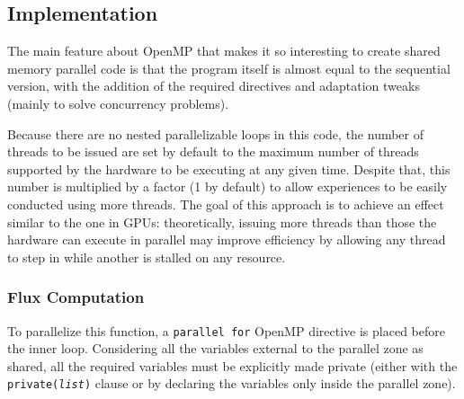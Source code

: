 \documentclass[9pt,twocolumn]{scrartcl}
\newcommand{\paragraphh}[1]{\paragraph{#1\hfill}\hfill

}
\begin{document}
\subsection{Implementation}
The main feature about OpenMP that makes it so interesting to create shared memory parallel code is that the program itself is almost equal to the sequential version, with the addition of the required directives and adaptation tweaks (mainly to solve concurrency problems).

Because there are no nested parallelizable loops in this code, the number of threads to be issued are set by default to the maximum number of threads supported by the hardware to be executing at any given time. Despite that, this number is multiplied by a factor (1 by default) to allow experiences to be easily conducted using more threads. The goal of this approach is to achieve an effect similar to the one in GPUs: theoretically, issuing more threads than those the hardware can execute in parallel may improve efficiency by allowing any thread to step in while another is stalled on any resource.

\subsubsection{Flux Computation}

To parallelize this function, a \texttt{parallel for} OpenMP directive is placed before the inner loop. Considering all the variables external to the parallel zone as shared, all the required variables must be explicitly made private (either with the \texttt{private({\textit{list}})} clause or by declaring the variables only inside the parallel zone).

%
\end{document}
